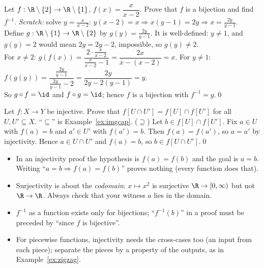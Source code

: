 \begin{hexample}
Let $f:\R\setminus\{2\}\to\R\setminus\{1\}$, $f(x)=\dfrac{x}{x-2}$. Prove that $f$ is a bijection and find $f^{-1}$.
\solution
\emph{Scratch:} solve $y=\frac x{x-2}$: $y(x-2)=x\Rightarrow x(y-1)=2y\Rightarrow x=\frac{2y}{y-1}$.\\
Define $g:\R\setminus\{1\}\to\R\setminus\{2\}$ by $g(y)=\frac{2y}{y-1}$. It is well-defined: $y\neq1$, and $g(y)=2$ would mean $2y=2y-2$, impossible, so $g(y)\neq2$.\\
For $x\neq2$: $g(f(x))=\dfrac{2\cdot\frac x{x-2}}{\frac x{x-2}-1}=\dfrac{2x}{x-(x-2)}=x$. \quad For $y\neq1$: $f(g(y))=\dfrac{\frac{2y}{y-1}}{\frac{2y}{y-1}-2}=\dfrac{2y}{2y-2(y-1)}=y$.\\
So $g\circ f=\id$ and $f\circ g=\id$; hence $f$ is a bijection with $f^{-1}=g$.\qed
\end{hexample}

\begin{hexample}
Let $f:X\to Y$ be injective. Prove that $f[U\cap U']=f[U]\cap f[U']$ for all $U,U'\subseteq X$.
\solution
``$\subseteq$'' is Example~\ref{ex:imgcap}. ($\supseteq$) Let $b\in f[U]\cap f[U']$. Fix $a\in U$ with $f(a)=b$ and $a'\in U'$ with $f(a')=b$. Then $f(a)=f(a')$, so $a=a'$ by injectivity. Hence $a\in U\cap U'$ and $f(a)=b$, so $b\in f[U\cap U']$.\qed
\end{hexample}

\begin{warn}
\begin{itemize}
\item In an injectivity proof the hypothesis is $f(a)=f(b)$ and the goal is $a=b$. Writing ``$a=b\Rightarrow f(a)=f(b)$'' proves nothing (every function does that).
\item Surjectivity is about the \emph{codomain}: $x\mapsto x^2$ is surjective $\R\to[0,\infty)$ but not $\R\to\R$. Always check that your witness $a$ lies in the domain.
\item $f^{-1}$ as a function exists only for bijections; ``$f^{-1}(b)$'' in a proof must be preceded by ``since $f$ is bijective''.
\item For piecewise functions, injectivity needs the cross-cases too (an input from each piece); separate the pieces by a property of the outputs, as in Example~\ref{ex:zigzag}.
\end{itemize}
\end{warn}

